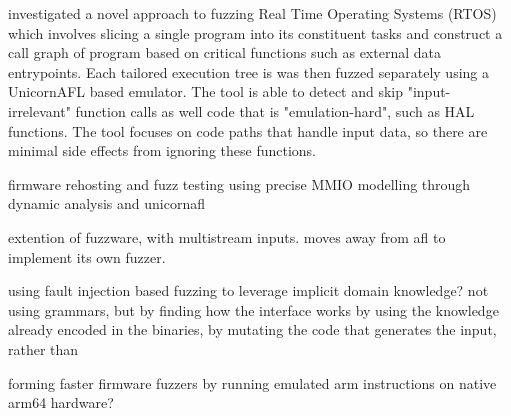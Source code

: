 \documentclass[../report.tex]{subfiles}
\begin{document}
\citet{Chen_2022} investigated a novel approach to fuzzing Real Time Operating
Systems (RTOS) which involves slicing a single program into its constituent
tasks and construct a call graph of program based on critical functions such as
external data entrypoints. Each tailored execution tree is was then fuzzed
separately using a UnicornAFL based emulator. The tool is able to detect and
skip "input-irrelevant" function calls as well code that is "emulation-hard",
such as HAL functions. The tool focuses on code paths that handle input data,
so there are minimal side effects from ignoring these functions.


\citet{Fuzzware_2022} firmware rehosting and fuzz testing using precise MMIO modelling through dynamic analysis and unicornafl

\citet{Hoedur_2023} extention of fuzzware, with multistream inputs. moves away from afl to implement its own fuzzer.

\citet{Fuzztruction_2023} using fault injection based fuzzing to leverage implicit domain knowledge? not using grammars, but by finding how the interface works by using the knowledge already encoded in the binaries, by mutating the code that generates the input, rather than

\citet{Seidel_2023} forming faster firmware fuzzers by running emulated arm instructions on native arm64 hardware?
\end{document}
